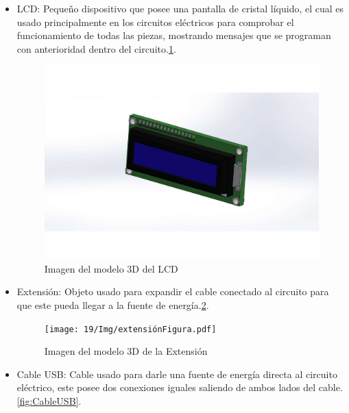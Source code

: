 \begin{itemize}
    \item LCD: Pequeño dispositivo que posee una pantalla de cristal líquido, el cual es usado principalmente en los circuitos eléctricos para comprobar el funcionamiento de todas las piezas, mostrando mensajes que se programan con anterioridad dentro del circuito.\ref{fig:LCD}.
    
            \begin{figure}[H]
        \centering
        \includegraphics[trim = {65mm 60mm 60mm 50mm},clip,scale=0.5]{19/Img/icdFigura.pdf}
        \caption{Imagen del modelo 3D del LCD}
        \label{fig:LCD}
    \end{figure}
    
    \item Extensión: Objeto usado para expandir el cable conectado al circuito para que este pueda llegar a la fuente de energía.\ref{fig:Extension}.
    
            \begin{figure}[H]
        \centering
        \texttt{[image: 19/Img/extensiónFigura.pdf]}
        \caption{Imagen del modelo 3D de la Extensión}
        \label{fig:Extension}
    \end{figure}
    
    \item Cable USB: Cable usado para darle una fuente de energía directa al circuito eléctrico, este posee dos conexiones iguales saliendo de ambos lados del cable.\ref{fig:CableUSB}.
    

\end{itemize}
